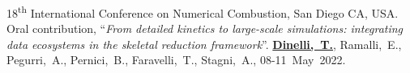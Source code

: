 \begin{etaremune}
   \item
      18\textsuperscript{th} International Conference on Numerical Combustion, San Diego
      CA, USA. Oral contribution, ``{\it From detailed kinetics to large-scale
      simulations: integrating data ecosystems in the skeletal reduction framework}''.
      {\bf \underline{Dinelli,~T.}}, Ramalli,~E., Pegurri,~A., Pernici,~B.,
      Faravelli,~T., Stagni,~A.,
      08-11~May~2022.
\end{etaremune}
